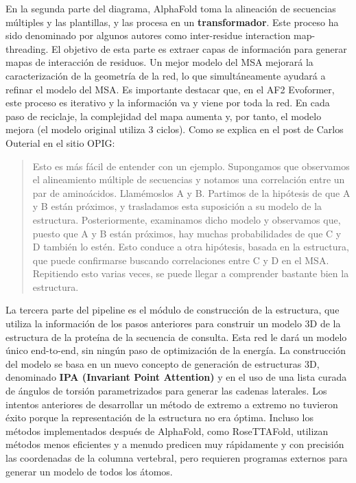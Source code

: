 En la segunda parte del diagrama, AlphaFold toma la alineación de secuencias múltiples y las plantillas, y las procesa en un \textbf{transformador}. Este proceso ha sido denominado por algunos autores como inter-residue interaction map-threading. El objetivo de esta parte es extraer capas de información para generar mapas de interacción de residuos. Un mejor modelo del MSA mejorará la caracterización de la geometría de la red, lo que simultáneamente ayudará a refinar el modelo del MSA. Es importante destacar que, en el AF2 Evoformer, este proceso es iterativo y la información va y viene por toda la red. En cada paso de reciclaje, la complejidad del mapa aumenta y, por tanto, el modelo mejora (el modelo original utiliza 3 ciclos). Como se explica en el post de Carlos Outerial en el sitio OPIG:
\begin{quote}
Esto es más fácil de entender con un ejemplo. Supongamos que observamos el alineamiento múltiple de secuencias y notamos una correlación entre un par de aminoácidos. Llamémoslos A y B. Partimos de la hipótesis de que A y B están próximos, y trasladamos esta suposición a su modelo de la estructura. Posteriormente, examinamos dicho modelo y observamos que, puesto que A y B están próximos, hay muchas probabilidades de que C y D también lo estén. Esto conduce a otra hipótesis, basada en la estructura, que puede confirmarse buscando correlaciones entre C y D en el MSA. Repitiendo esto varias veces, se puede llegar a comprender bastante bien la estructura.
\end{quote}

La tercera parte del pipeline es el módulo de construcción de la estructura, que utiliza la información de los pasos anteriores para construir un modelo 3D de la estructura de la proteína de la secuencia de consulta. Esta red le dará un modelo único end-to-end, sin ningún paso de optimización de la energía. La construcción del modelo se basa en un nuevo concepto de generación de estructuras 3D, denominado \textbf{IPA (Invariant Point Attention)} y en el uso de una lista curada de ángulos de torsión parametrizados para generar las cadenas laterales. Los intentos anteriores de desarrollar un método de extremo a extremo no tuvieron éxito porque la representación de la estructura no era óptima. Incluso los métodos implementados después de AlphaFold, como RoseTTAFold, utilizan métodos menos eficientes y a menudo predicen muy rápidamente y con precisión las coordenadas de la columna vertebral, pero requieren programas externos para generar un modelo de todos los átomos.

